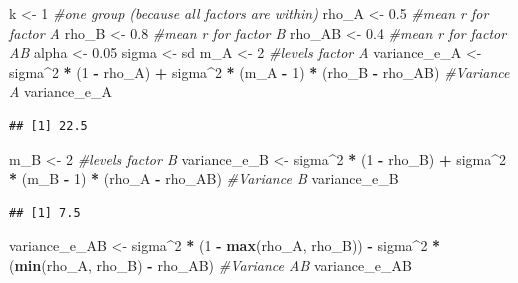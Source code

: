 \documentclass[]{book}
\newenvironment{Shaded}{\begin{snugshade}}{\end{snugshade}}
\newcommand{\CommentTok}[1]{\textcolor[rgb]{0.56,0.35,0.01}{\textit{#1}}}
\newcommand{\DecValTok}[1]{\textcolor[rgb]{0.00,0.00,0.81}{#1}}
\newcommand{\FloatTok}[1]{\textcolor[rgb]{0.00,0.00,0.81}{#1}}
\newcommand{\KeywordTok}[1]{\textcolor[rgb]{0.13,0.29,0.53}{\textbf{#1}}}
\newcommand{\NormalTok}[1]{#1}
\newcommand{\OperatorTok}[1]{\textcolor[rgb]{0.81,0.36,0.00}{\textbf{#1}}}
\newcommand{\StringTok}[1]{\textcolor[rgb]{0.31,0.60,0.02}{#1}}
\begin{document}
\begin{Shaded}
\begin{Highlighting}[]
\NormalTok{k <-}\StringTok{ }\DecValTok{1} \CommentTok{#one group (because all factors are within)}
\NormalTok{rho_A <-}\StringTok{ }\FloatTok{0.5} \CommentTok{#mean r for factor A}
\NormalTok{rho_B <-}\StringTok{ }\FloatTok{0.8} \CommentTok{#mean r for factor B}
\NormalTok{rho_AB <-}\StringTok{ }\FloatTok{0.4} \CommentTok{#mean r for factor AB}
\NormalTok{alpha <-}\StringTok{ }\FloatTok{0.05}
\NormalTok{sigma <-}\StringTok{ }\NormalTok{sd}
\NormalTok{m_A <-}\StringTok{ }\DecValTok{2} \CommentTok{#levels factor A}
\NormalTok{variance_e_A <-}\StringTok{ }\NormalTok{sigma}\OperatorTok{^}\DecValTok{2} \OperatorTok{*}\StringTok{ }\NormalTok{(}\DecValTok{1} \OperatorTok{-}\StringTok{ }\NormalTok{rho_A) }\OperatorTok{+}\StringTok{ }\NormalTok{sigma}\OperatorTok{^}\DecValTok{2} \OperatorTok{*}\StringTok{ }\NormalTok{(m_A }\OperatorTok{-}\StringTok{ }\DecValTok{1}\NormalTok{) }\OperatorTok{*}\StringTok{ }\NormalTok{(rho_B }\OperatorTok{-}\StringTok{ }\NormalTok{rho_AB) }\CommentTok{#Variance A}
\NormalTok{variance_e_A}
\end{Highlighting}
\end{Shaded}

\begin{verbatim}
## [1] 22.5
\end{verbatim}

\begin{Shaded}
\begin{Highlighting}[]
\NormalTok{m_B <-}\StringTok{ }\DecValTok{2} \CommentTok{#levels factor B}
\NormalTok{variance_e_B <-}\StringTok{ }\NormalTok{sigma}\OperatorTok{^}\DecValTok{2} \OperatorTok{*}\StringTok{ }\NormalTok{(}\DecValTok{1} \OperatorTok{-}\StringTok{ }\NormalTok{rho_B) }\OperatorTok{+}\StringTok{ }\NormalTok{sigma}\OperatorTok{^}\DecValTok{2} \OperatorTok{*}\StringTok{ }\NormalTok{(m_B }\OperatorTok{-}\StringTok{ }\DecValTok{1}\NormalTok{) }\OperatorTok{*}\StringTok{ }\NormalTok{(rho_A }\OperatorTok{-}\StringTok{ }\NormalTok{rho_AB) }\CommentTok{#Variance B}
\NormalTok{variance_e_B}
\end{Highlighting}
\end{Shaded}

\begin{verbatim}
## [1] 7.5
\end{verbatim}

\begin{Shaded}
\begin{Highlighting}[]
\NormalTok{variance_e_AB <-}\StringTok{ }\NormalTok{sigma}\OperatorTok{^}\DecValTok{2} \OperatorTok{*}\StringTok{ }\NormalTok{(}\DecValTok{1} \OperatorTok{-}\StringTok{ }\KeywordTok{max}\NormalTok{(rho_A, rho_B)) }\OperatorTok{-}\StringTok{ }\NormalTok{sigma}\OperatorTok{^}\DecValTok{2} \OperatorTok{*}\StringTok{ }\NormalTok{(}\KeywordTok{min}\NormalTok{(rho_A, rho_B) }\OperatorTok{-}\StringTok{ }\NormalTok{rho_AB) }\CommentTok{#Variance AB}
\NormalTok{variance_e_AB}
\end{Highlighting}
\end{Shaded}
\end{document}
